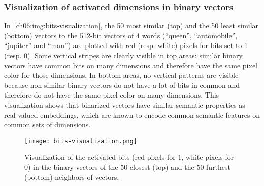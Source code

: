     \subsubsection{Visualization of activated dimensions in binary vectors}
      In~\autoref{ch06:img:bits-visualization}, the 50 most similar (top) and
      the 50 least similar (bottom) vectors to the 512-bit vectors of 4 words
      (``queen'', ``automobile'', ``jupiter'' and ``man'') are plotted with red
      (resp. white) pixels for bits set to 1 (resp. 0). Some vertical stripes
      are clearly visible in top areas: similar binary vectors have common bits
      on many dimensions and therefore have the same pixel color for those
      dimensions. In bottom areas, no vertical patterns are visible because
      non-similar binary vectors do not have a lot of bits in common and
      therefore do not have the same pixel color on many dimensions. This
      visualization shows that binarized vectors have similar semantic
      properties as real-valued embeddings, which are known to encode common
      semantic features on common sets of dimensions.

      \begin{figure}[h]
        \centering
          \texttt{[image: bits-visualization.png]}
          \caption[Visualization of the activated bits in some binary
          vectors.]{Visualization of the activated bits (red pixels for 1,
          white pixels for 0) in the binary vectors of the 50 closest
          (top) and the 50 furthest (bottom) neighbors of vectors.}
          \label{ch06:img:bits-visualization}
      \end{figure}

